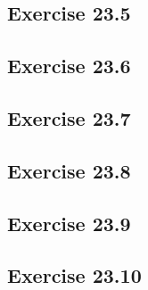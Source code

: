 \documentclass[]{book}
\theoremstyle{definition}
\theoremstyle{definition}
\theoremstyle{remark}
\begin{document}
\subsection{Exercise 23.5}\label{exercise-23.5}

\subsection{Exercise 23.6}\label{exercise-23.6}

\subsection{Exercise 23.7}\label{exercise-23.7}

\subsection{Exercise 23.8}\label{exercise-23.8}

\subsection{Exercise 23.9}\label{exercise-23.9}

\subsection{Exercise 23.10}\label{exercise-23.10}


\end{document}
